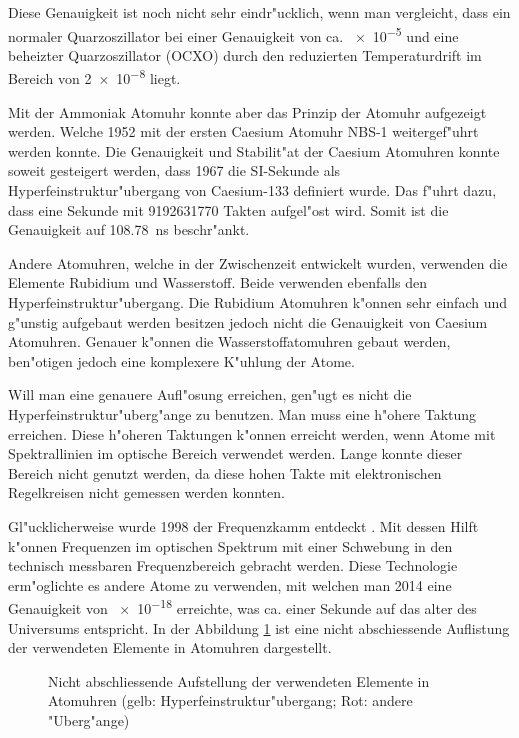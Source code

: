 \begin{refsection}
Diese Genauigkeit ist noch nicht sehr eindr"ucklich, wenn man
vergleicht, dass ein normaler Quarzoszillator bei einer Genauigkeit
von ca. \num{e-5} und eine beheizter Quarzoszillator (OCXO) durch den
reduzierten Temperaturdrift im Bereich von \num{2e-8} liegt.

Mit der Ammoniak Atomuhr konnte aber das Prinzip der Atomuhr
aufgezeigt werden.  Welche 1952 mit der ersten Caesium Atomuhr NBS-1
weitergef"uhrt werden konnte.  Die Genauigkeit und Stabilit"at der
Caesium Atomuhren konnte soweit gesteigert werden, dass 1967 die
SI-Sekunde als Hyperfeinstruktur"ubergang von Caesium-133 definiert
wurde.  Das f"uhrt dazu, dass eine Sekunde mit \num{9192631770} Takten
aufgel"ost wird.  Somit ist die Genauigkeit auf
\SI{108.78}{\nano\second} beschr"ankt.

Andere Atomuhren, welche in der Zwischenzeit entwickelt wurden,
verwenden die Elemente Rubidium und Wasserstoff.  Beide verwenden
ebenfalls den Hyperfeinstruktur"ubergang.  Die Rubidium Atomuhren
k"onnen sehr einfach und g"unstig aufgebaut werden besitzen jedoch
nicht die Genauigkeit von Caesium Atomuhren.  Genauer k"onnen die
Wasserstoffatomuhren gebaut werden, ben"otigen jedoch eine komplexere
K"uhlung der Atome.

Will man eine genauere Aufl"osung erreichen, gen"ugt es nicht die
Hyperfeinstruktur"uberg"ange zu benutzen.  Man muss eine h"ohere
Taktung erreichen.  Diese h"oheren Taktungen k"onnen erreicht werden,
wenn Atome mit Spektrallinien im optische Bereich verwendet werden.
Lange konnte dieser Bereich nicht genutzt werden, da diese hohen
Takte mit elektronischen Regelkreisen nicht gemessen werden konnten.

Gl"ucklicherweise wurde 1998 der Frequenzkamm entdeckt
\cite{SdW:kamm}.  Mit dessen Hilft k"onnen Frequenzen im optischen
Spektrum mit einer Schwebung in den technisch messbaren
Frequenzbereich gebracht werden.  Diese Technologie erm"oglichte es
andere Atome zu verwenden, mit welchen man 2014 eine Genauigkeit von
\num{e-18} erreichte, was ca. einer Sekunde auf das alter des
Universums entspricht.  In der Abbildung \ref{fig:periode} ist eine
nicht abschiessende Auflistung der verwendeten Elemente in Atomuhren
dargestellt.

\begin{figure}
  \centering
  
  \caption{Nicht abschliessende Aufstellung der verwendeten Elemente
    in Atomuhren (gelb: Hyperfeinstruktur"ubergang; Rot: andere
    "Uberg"ange)}
  \label{fig:periode}
\end{figure}


\end{refsection}
